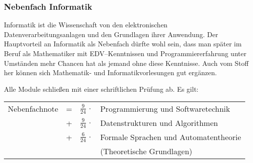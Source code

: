 \subsubsection{Nebenfach Informatik}

Informatik ist die Wissenschaft von den elektronischen
Datenverarbeitungsanlagen und den Grundlagen ihrer Anwendung.
Der Hauptvorteil an Informatik als Nebenfach dürfte wohl sein,
dass man später im Beruf als Ma\-the\-ma\-ti\-ker mit EDV--Kenntnissen
und Programmiererfahrung unter Umständen mehr Chancen
hat als jemand ohne diese Kenntnisse.
Auch vom Stoff her können sich Mathematik-
und Informatikvorlesungen gut ergänzen.\\[-3ex]
\begin{center}
\end{center}

Alle Module schließen mit einer schriftlichen Prüfung ab. Es gilt:\\[0.5ex]
\begin{tabular}{lcrl}
Nebenfachnote & = &$\frac{9}{24}\,\cdot$&Programmierung und Softwaretechnik\\[0.5ex]
              & + &$\frac{9}{24}\,\cdot$&Datenstrukturen und Algorithmen\\[0.5ex]
              & + &$\frac{6}{24}\,\cdot$&Formale Sprachen und Automatentheorie\\
&&& (Theoretische Grundlagen)\\ 
\end{tabular}

